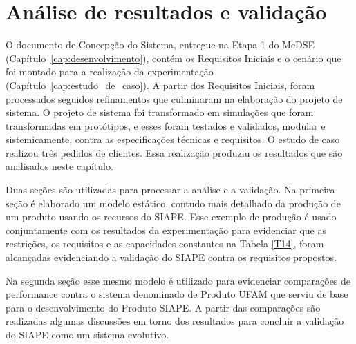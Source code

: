 	\chapter{Análise de resultados e validação}
	\label{cap:analise_de_resultados}
		
	O documento de Concepção do Sistema, entregue na Etapa 1 do MeDSE (Capítulo~\ref{cap:desenvolvimento}), contém os Requisitos Iniciais e o cenário que foi montado para a realização da experimentação (Capítulo~\ref{cap:estudo_de_caso}). A partir dos Requisitos Iniciais, foram processados seguidos refinamentos que culminaram na elaboração do projeto de sistema. O projeto de sistema foi transformado em simulações que foram transformadas em protótipos, e esses foram testados e validados, modular e sistemicamente, contra as especificações técnicas e requisitos. O estudo de caso realizou três pedidos de clientes. Essa realização produziu os resultados que são analisados neste capítulo.
		
	Duas seções são utilizadas para processar a análise e a validação. Na primeira seção é elaborado um modelo estático, contudo mais detalhado da produção de um produto usando os recursos do SIAPE. Esse exemplo de produção é usado conjuntamente com os resultados da experimentação para evidenciar que as restrições, os requisitos e as capacidades constantes na Tabela \ref{T14}, foram alcançadas evidenciando a validação do SIAPE contra os requisitos propostos.
			
	Na segunda seção esse mesmo modelo é utilizado para evidenciar comparações de performance contra o sistema denominado de Produto UFAM que serviu de base para o desenvolvimento do Produto SIAPE. A partir das comparações são realizadas algumas discussões em torno dos resultados para concluir a validação do SIAPE como um sistema evolutivo.  
		
